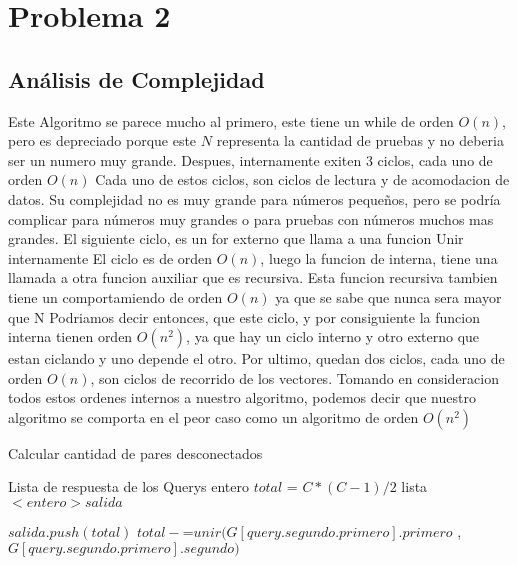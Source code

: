 \documentclass[a4paper,10pt]{article}
\begin{document}
\section{Problema 2}
\subsection{Análisis de Complejidad}
\hspace{2cm}Este Algoritmo se parece mucho al primero, este tiene
un while de orden {$O(n)$}, pero es depreciado porque este {$N$}
representa la cantidad de pruebas y no deberia ser un numero muy 
grande.
Despues, internamente exiten 3 ciclos, cada uno de orden {$O(n)$}
Cada uno de estos ciclos, son ciclos de lectura y de acomodacion de datos.
Su complejidad no es muy grande para números pequeños, pero se podría complicar
para números muy grandes o para pruebas con números muchos mas grandes.
El siguiente ciclo, es un for externo que llama a una funcion Unir internamente 
El ciclo es de orden {$O(n)$}, luego la funcion de interna, tiene una llamada a otra
funcion auxiliar que es recursiva. Esta funcion recursiva tambien tiene un comportamiendo de orden {$O(n)$}
ya que se sabe que nunca sera mayor que N Podriamos decir entonces, que este ciclo, 
y por consiguiente la funcion interna tienen orden {$O(n^{2})$}, ya que hay un ciclo interno 
y otro externo que estan ciclando y uno depende el otro.
Por ultimo, quedan dos ciclos, cada uno de orden {$O(n)$}, son ciclos de recorrido de los vectores. 
Tomando en consideracion todos estos ordenes internos a nuestro algoritmo, podemos decir 
que nuestro algoritmo se comporta en el peor caso como un algoritmo de orden {$O(n^{2})$}
\begin{algorithm}                      %
\caption{Calcular cantidad de pares desconectados}          %
\label{Problema 1}                           %
\begin{algorithmic}[1]                    %
    \ENSURE Lista de respuesta de los Querys
    \STATE entero $total$ = $C*(C-1)/2$
    \STATE lista $< entero > salida$
    \ENDFOR
         

	\STATE $salida.push(total)$
      \ELSE
	\STATE $total-$=$unir(G[query.segundo.primero].primero$ , $G[query.segundo.primero].segundo)$
      \ENDIF
    \ENDFOR {}
\end{algorithmic}
\end{algorithm}
\end{document}
